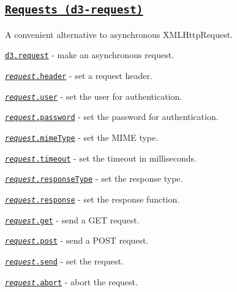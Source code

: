 \subsection*{\href{https://github.com/d3/d3-request}{\tt Requests (d3-\/request)}}

A convenient alternative to asynchronous X\+M\+L\+Http\+Request.


\begin{DoxyItemize}
\item \href{https://github.com/d3/d3-request/blob/master/README.md#request}{\tt d3.\+request} -\/ make an asynchronous request.
\item \href{https://github.com/d3/d3-request/blob/master/README.md#request_header}{\tt {\itshape request}.header} -\/ set a request header.
\item \href{https://github.com/d3/d3-request/blob/master/README.md#request_user}{\tt {\itshape request}.user} -\/ set the user for authentication.
\item \href{https://github.com/d3/d3-request/blob/master/README.md#request_password}{\tt {\itshape request}.password} -\/ set the password for authentication.
\item \href{https://github.com/d3/d3-request/blob/master/README.md#request_mimeType}{\tt {\itshape request}.mime\+Type} -\/ set the M\+I\+ME type.
\item \href{https://github.com/d3/d3-request/blob/master/README.md#request_timeout}{\tt {\itshape request}.timeout} -\/ set the timeout in milliseconds.
\item \href{https://github.com/d3/d3-request/blob/master/README.md#request_responseType}{\tt {\itshape request}.response\+Type} -\/ set the response type.
\item \href{https://github.com/d3/d3-request/blob/master/README.md#request_response}{\tt {\itshape request}.response} -\/ set the response function.
\item \href{https://github.com/d3/d3-request/blob/master/README.md#request_get}{\tt {\itshape request}.get} -\/ send a G\+ET request.
\item \href{https://github.com/d3/d3-request/blob/master/README.md#request_post}{\tt {\itshape request}.post} -\/ send a P\+O\+ST request.
\item \href{https://github.com/d3/d3-request/blob/master/README.md#request_send}{\tt {\itshape request}.send} -\/ set the request.
\item \href{https://github.com/d3/d3-request/blob/master/README.md#request_abort}{\tt {\itshape request}.abort} -\/ abort the request.

\end{DoxyItemize}
